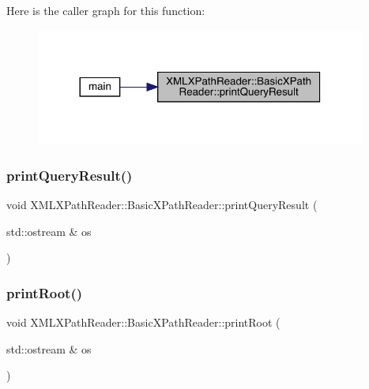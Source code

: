 Here is the caller graph for this function\+:
\nopagebreak
\begin{figure}[H]
\begin{center}
\leavevmode
\includegraphics[width=308pt]{d6/dbf/classXMLXPathReader_1_1BasicXPathReader_a719ba9bbd4ae77d6be9a6544a2d0ccaf_icgraph}
\end{center}
\end{figure}
\mbox{\label{classXMLXPathReader_1_1BasicXPathReader_a719ba9bbd4ae77d6be9a6544a2d0ccaf}} 
\subsubsection{\texorpdfstring{printQueryResult()}{printQueryResult()}\hspace{0.1cm}{\footnotesize\ttfamily [2/2]}}
{\footnotesize\ttfamily void X\+M\+L\+X\+Path\+Reader\+::\+Basic\+X\+Path\+Reader\+::print\+Query\+Result (\begin{DoxyParamCaption}\item[{std\+::ostream \&}]{os }\end{DoxyParamCaption})}

\mbox{\label{classXMLXPathReader_1_1BasicXPathReader_abc0bfad898a5b01d2251d7aaacbbb507}} 
\subsubsection{\texorpdfstring{printRoot()}{printRoot()}\hspace{0.1cm}{\footnotesize\ttfamily [1/2]}}
{\footnotesize\ttfamily void X\+M\+L\+X\+Path\+Reader\+::\+Basic\+X\+Path\+Reader\+::print\+Root (\begin{DoxyParamCaption}\item[{std\+::ostream \&}]{os }\end{DoxyParamCaption})}



